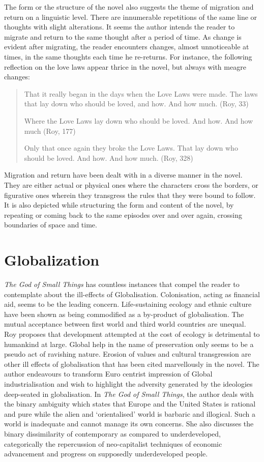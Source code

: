 The form or the structure of the novel also suggests the theme of migration and return on a linguistic level. There are innumerable repetitions of the same line or thoughts with slight alterations. It seems the author intends the reader to migrate and return to the same thought after a period of time. As change is evident after migrating, the reader encounters changes, almost unnoticeable at times, in the same thoughts each time he re-returns. For instance, the following reflection on the love laws appear thrice in the novel, but always with meagre changes: 

\begin{quote}
  That it really began in the days when the Love Laws were made. The laws that lay down who should be loved, and how. And how much. (Roy, 33) 

  Where the Love Laws lay down who should be loved. And how. And how much (Roy, 177) 

  Only that once again they broke the Love Laws. That lay down who should be loved. And how. And how much. (Roy, 328) 
\end{quote}

Migration and return have been dealt with in a diverse manner in the novel. They are either actual or physical ones where the characters cross the borders, or figurative ones wherein they transgress the rules that they were bound to follow. It is also depicted while structuring the form and content of the novel, by repeating or coming back to the same episodes over and over again, crossing boundaries of space and time.

\section{Globalization}

\emph{The God of Small Things} has countless instances that compel the reader to contemplate about the ill-effects of Globalisation. Colonisation, acting as financial aid, seems to be the leading concern. Life-sustaining ecology and ethnic culture have been shown as being commodified as a by-product of globalisation. The mutual acceptance between first world and third world countries are unequal. Roy proposes that development attempted at the cost of ecology is detrimental to humankind at large. Global help in the name of preservation only seems to be a pseudo act of ravishing nature. Erosion of values and cultural transgression are other ill effects of globalisation that has been cited marvellously in the novel. The author endeavours to transform Euro centrist impression of Global industrialisation and wish to highlight the adversity generated by the ideologies deep-seated in globalisation. In \emph{The God of Small Things}, the author deals with the binary ambiguity which states that Europe and the United States is rational and pure while the alien and ‘orientalised’ world is barbaric and illogical. Such a world is inadequate and cannot manage its own concerns. She also discusses the binary dissimilarity of contemporary as compared to underdeveloped, categorically the repercussion of neo-capitalist techniques of economic advancement and progress on supposedly underdeveloped people. 

